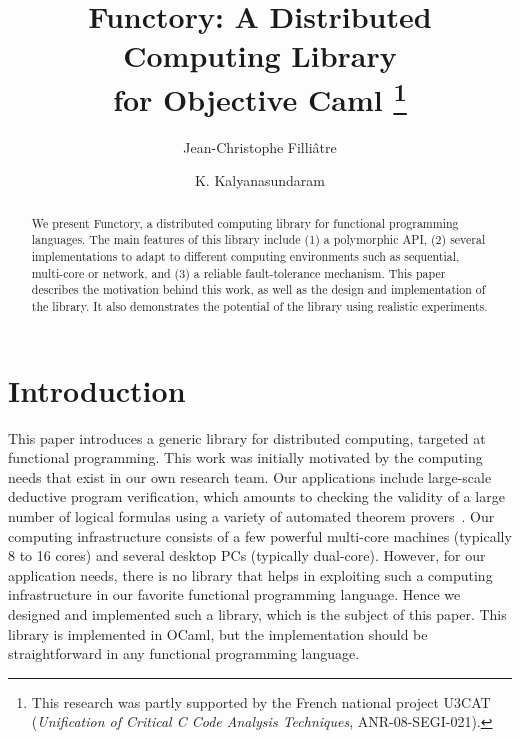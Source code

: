 \documentclass[tfpsymp,pagenumbers]{tfp07symp}
\newcommand{\Ocaml}{OCaml}
\newcommand{\functory}{\textsf{Functory}}
\begin{document}
\title{Functory: A Distributed Computing Library \\ for Objective Caml 
\thanks{This
    research was partly supported by the French national project U3CAT
    (\emph{Unification of Critical C Code Analysis Techniques},
    ANR-08-SEGI-021).}}

\author{Jean-Christophe Filli\^{a}tre \and K. Kalyanasundaram}


\maketitle

\begin{abstract}
  We present Functory, a distributed computing library for
  functional programming languages. The main features of this library
  include (1) a polymorphic API, (2) several implementations to
  adapt to different computing environments such as sequential,
  multi-core or network, and (3) a reliable fault-tolerance mechanism.
  This paper describes the motivation behind this work, as well as
  the design and implementation of the library. It also demonstrates
  the potential of the library using realistic experiments.
\end{abstract}


\section{Introduction}


This paper introduces a generic library for distributed computing,
targeted at functional programming. 
This work was initially motivated by the computing needs that exist in our
own research team. Our applications include large-scale deductive
program verification, which amounts to checking the validity of a
large number of logical formulas using a variety of automated theorem
provers~\cite{filliatre07cav}. Our computing infrastructure consists
of a few powerful multi-core machines (typically 8 to 16 cores) and
several desktop PCs (typically dual-core). However, for our
application needs, there is no library that helps in exploiting such a
computing infrastructure in our favorite functional programming
language.  Hence we designed and implemented such a
library, which is the subject of this paper.
This library is implemented in \Ocaml, but the
implementation should be straightforward in any functional
programming language.
\end{document}
